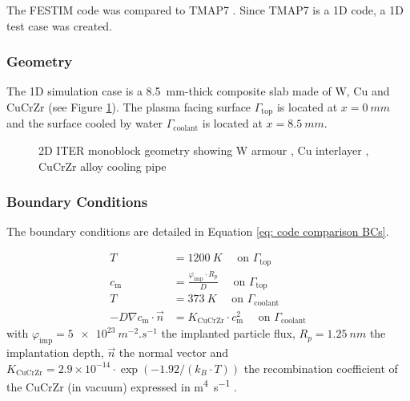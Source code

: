 The FESTIM code was compared to TMAP7 .
Since TMAP7 is a 1D code, a 1D test case was created.


\subsubsection{Geometry}
The 1D simulation case is a \SI{8.5}{mm}-thick composite slab made of W, Cu and CuCrZr (see Figure \ref{fig: monoblock 1D geometry}).
The plasma facing surface $\Gamma_\mathrm{top}$ is located at $x=\SI{0}{mm}$ and the surface cooled by water $\Gamma_\mathrm{coolant}$ is located at $x=\SI{8.5}{mm}$.

\begin{figure}
     \caption{2D ITER monoblock geometry showing W armour \cruleme[grey]{0.3cm}{0.3cm}, Cu interlayer \cruleme[orange]{0.3cm}{0.3cm}, CuCrZr alloy cooling pipe  \cruleme[yellow]{0.3cm}{0.3cm}}\label{fig: monoblock geometry}
     \label{fig: monoblock 1D geometry}
\end{figure}

\subsubsection{Boundary Conditions}
The boundary conditions are detailed in Equation \ref{eq: code comparison BCs}.

\begin{subequations}
    \begin{align}
    T &= \SI{1200}{K}\quad \text { on } \Gamma_\mathrm{top}\\
    c_\mathrm{m} &=  \frac{\varphi_\mathrm{imp} \cdot R_p}{D} \quad \text { on } \Gamma_\mathrm{top}\\
    T &= \SI{373}{K} \quad \text { on } \Gamma_\mathrm{coolant}\\
    -D \nabla c_\mathrm{m} \cdot \vec{n} &= K_\mathrm{CuCrZr} \cdot c_\mathrm{m}^{2} \quad \text { on } \Gamma_\mathrm{coolant}  
    \end{align}
    \label{eq: code comparison BCs}
\end{subequations}
with $\varphi_\mathrm{imp} = \SI{5e23}{m^{-2}.s^{-1}}$ the implanted particle flux, $R_p = \SI{1.25}{nm}$ the implantation depth, $\vec{n}$ the normal vector and $K_\mathrm{CuCrZr} = 2.9 \times 10^{-14}\cdot \exp{(-1.92/(k_B\cdot T))}$ the recombination coefficient of the CuCrZr (in vacuum) expressed in \si{m^4.s^{-1}} .

